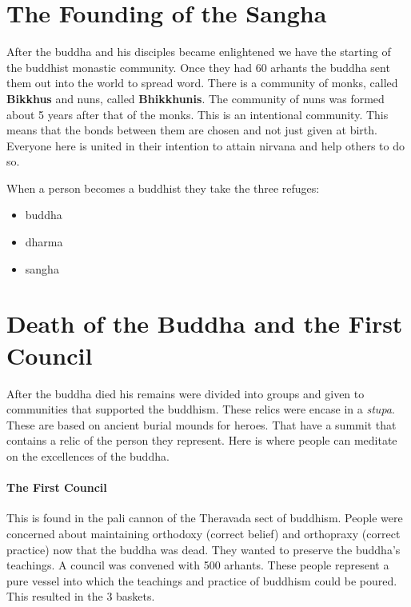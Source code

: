 \documentclass{article}
\begin{document}
\section*{The Founding of the Sangha}
\label{sec:the_founding_of_the_sangha}
After the buddha and his disciples became enlightened we have the starting of the buddhist monastic community. Once they had 60 arhants the buddha sent them out into the world to spread word. There is a community of monks, called \textbf{Bikkhus} and nuns, called \textbf{Bhikkhunis}. The community of nuns was formed about 5 years after that of the monks. This is an intentional community. This means that the bonds between them are chosen and not just given at birth. Everyone here is united in their intention to attain nirvana and help others to do so.

When a person becomes a buddhist they take the three refuges:
\begin{itemize}
	\item buddha
	\item dharma
	\item sangha
\end{itemize}

\section*{Death of the Buddha and the First Council}
\label{sec:death_of_the_buddha_and_the_first_council}
After the buddha died his remains were divided into groups and given to communities that supported the buddhism. These relics were encase in a \emph{stupa}. These are based on ancient burial mounds for heroes. That have a summit that contains a relic of the person they represent. Here is where people can meditate on the excellences of the buddha.

\paragraph{The First Council}
\label{par:the_first_council}
This is found in the pali cannon of the Theravada sect of buddhism. People were concerned about maintaining orthodoxy (correct belief) and orthopraxy (correct practice) now that the buddha was dead. They wanted to preserve the buddha's teachings. A council was convened with 500 arhants. These people represent a pure vessel into which the teachings and practice of buddhism could be poured. This resulted in the 3 baskets.
\end{document}
